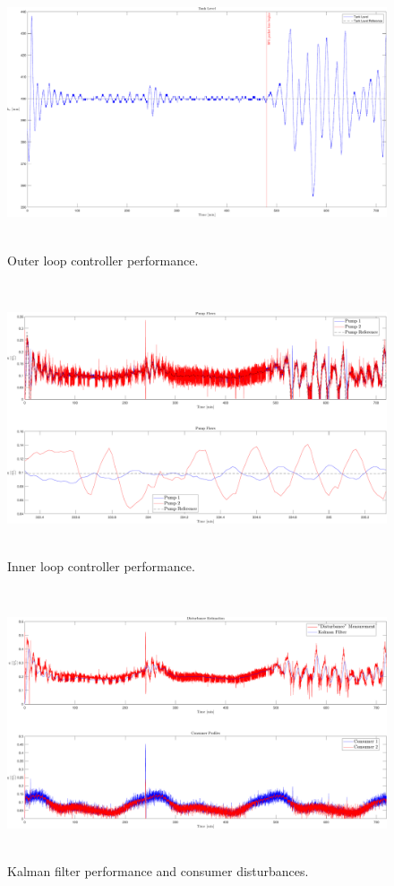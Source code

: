 \clearpage

\begin{figure}[h!]
	\includegraphics[height=8cm,width=\linewidth]{Pictures/OuterLoop.pdf}
	\caption{Outer loop controller performance.}
	\label{fig:OuterLoop}
\end{figure}

\begin{figure}[h!]
	\includegraphics[height=8cm,width=\linewidth]{Pictures/InnerLoop.pdf}
	\caption{Inner loop controller performance.}
	\label{fig:InnerLoop}
\end{figure}

\begin{figure}[h!]
	\includegraphics[height=8cm,width=\linewidth]{Pictures/DisturbanceEstimation.pdf}
	\caption{Kalman filter performance and consumer disturbances.}
	\label{fig:DisturbanceEstimation}
\end{figure}

